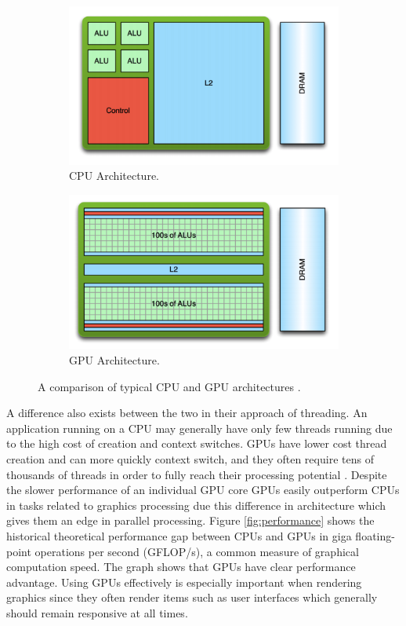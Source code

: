 \documentclass{article}
\begin{document}
\begin{figure}[h]
    \centering
    \begin{subfigure}[b]{0.39\textwidth}
    	\includegraphics[width=\textwidth]{cpu}
    	\caption{CPU Architecture.}
    	\label{fig:cpu}
    \end{subfigure}
    \begin{subfigure}[b]{0.39\textwidth}
	    \includegraphics[width=\textwidth]{gpu}
	    \caption{GPU Architecture.}
	    \label{fig:gpu}
    \end{subfigure}
	\caption{A comparison of typical CPU and GPU architectures \cite{larkin2016}.}
	\label{fig:architecture}
\end{figure}

A difference also exists between the two in their approach of threading. An application running on a CPU may generally have only few threads running due to the high cost of creation and context switches. GPUs have lower cost thread creation and can more quickly context switch, and they often require tens of thousands of threads in order to fully reach their processing potential \cite{larkin2016}. Despite the slower performance of an individual GPU core GPUs easily outperform CPUs in tasks related to graphics processing due this difference in architecture which gives them an edge in parallel processing. Figure \ref{fig:performance} shows the historical theoretical performance gap between CPUs and GPUs in giga floating-point operations per second (GFLOP/s), a common measure of graphical computation speed. The graph shows that GPUs have clear performance advantage. Using GPUs effectively is especially important when rendering graphics since they often render items such as user interfaces which generally should remain responsive at all times.
\end{document}
